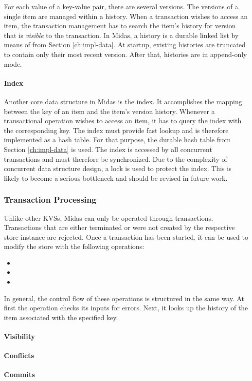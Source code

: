 For each value of a key-value pair, there are several versions. The versions of a single item are managed within a history. When a transaction wishes to access an item, the transaction management has to search the item's history for version that is \emph{visible} to the transaction. In Midas, a history is a durable linked list by means of  from Section \ref{ch:impl-data}. At startup, existing histories are truncated to contain only their most recent version. After that, histories are in append-only mode.

\paragraph{Index}

Another core data structure in Midas is the index. It accomplishes the mapping between the key of an item and the item's version history. Whenever a transactional operation wishes to access an item, it has to query the index with the corresponding key. The index must provide fast lookup and is therefore implemented as a hash table. For that purpose, the durable hash table  from Section \ref{ch:impl-data} is used. The index is accessed by all concurrent transactions and must therefore be synchronized. Due to the complexity of concurrent data structure design, a lock is used to protect the index. This is likely to become a serious bottleneck and should be revised in future work.

\subsubsection{Transaction Processing}

Unlike other \acp{KVS}, Midas can only be operated through transactions. Transactions that are either terminated or were not created by the respective store instance are rejected. Once a transaction has been started, it can be used to modify the store with the following operations:

\begin{itemize}
    \item {}
    \item {}
    \item {}
\end{itemize}

In general, the control flow of these operations is structured in the same way. At first the operation checks its inputs for errors. Next, it looks up the history of the item associated with the specified key.

\paragraph{Visibility}

\paragraph{Conflicts}

\paragraph{Commits}
